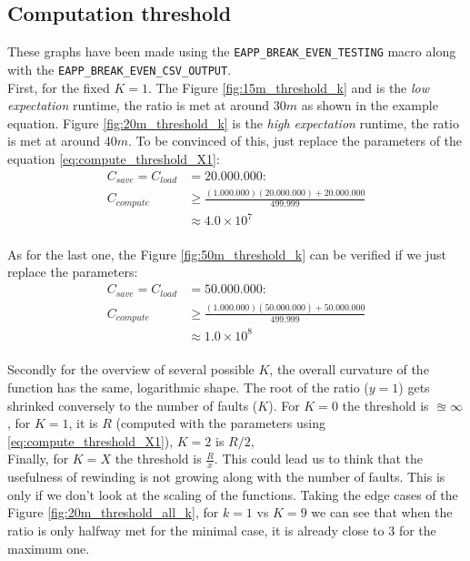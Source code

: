 \documentclass[11pt,a4paper]{report}
\begin{document}
\subsection{Computation threshold}
\label{sub:threshold}
These graphs have been made using the \verb|EAPP_BREAK_EVEN_TESTING| macro along with the \verb|EAPP_BREAK_EVEN_CSV_OUTPUT|.
\\

First, for the fixed $K=1$.
The Figure \ref{fig:15m_threshold_k} and  is the \textit{low expectation} runtime, the ratio is met at around $30m$ as shown in the example equation.
Figure \ref{fig:20m_threshold_k} is the \textit{high expectation} runtime, the ratio is met at around $40m$.
To be convinced of this, just replace the parameters of the equation \ref{eq:compute_threshold_X1}:
\begin{align*}
C_{save}=C_{load}&=20.000.000:\quad\\
C_{compute} &\ge \frac{(1.000.000)(20.000.000) + 20.000.000}{499.999} \\
&\approx 4.0\times 10^{7}
\end{align*}
\\
As for the last one, the Figure \ref{fig:50m_threshold_k} can be verified if we just replace the parameters:
\begin{align*}
C_{save}=C_{load}&=50.000.000:\quad\\
C_{compute} &\ge \frac{(1.000.000)(50.000.000) + 50.000.000}{499.999} \\
&\approx 1.0\times 10^{8}
\end{align*}
\\

Secondly for the overview of several possible $K$, the overall curvature of the function has the same, logarithmic shape.
The root of the ratio ($y{=}1$) gets shrinked conversely to the number of faults ($K$).
For $K{=}0$ the threshold is $\approxeq \infty$, for $K{=}1$, it is $R$ (computed with the parameters using \ref{eq:compute_threshold_X1}), $K{=}2$ is $R/2$,
\\

Finally, for $K{=}X$ the threshold is $\frac{R}{x}$. 
This could lead us to think that the usefulness of rewinding is not growing along with the number of faults. 
This is only if we don't look at the scaling of the functions. 
Taking the edge cases of the Figure \ref{fig:20m_threshold_all_k}, for $k{=}1$ vs $K{=}9$ we can see that when the ratio is only halfway met for the minimal case, it is already close to $3$ for the maximum one.
\end{document}
